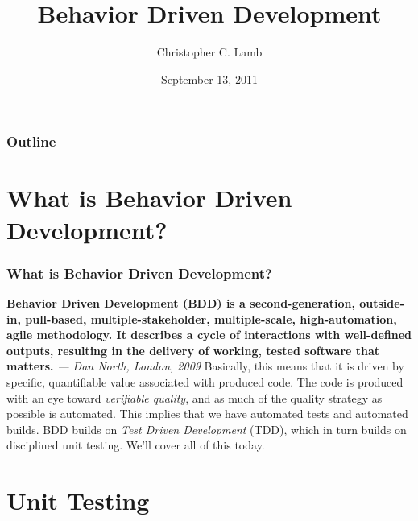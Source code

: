 \documentclass[t, 10pt]{beamer}
\title{Behavior Driven Development}
\author [Chris]{Christopher C. Lamb}
\institute[University of New Mexico]{
\inst {}Department of Electrical and Computer Engineering\\
University of New Mexico}
\date{September 13, 2011}
\begin{document}
\begin{frame}
\titlepage
\end{frame}


\begin{frame}
\frametitle{Outline}
\tableofcontents 
\end{frame}

\section{What is Behavior Driven Development?}

\begin{frame}
\frametitle{What is Behavior Driven Development?}
\textbf{Behavior Driven Development (BDD) is a second-generation, outside-in, pull-based, multiple-stakeholder, multiple-scale, high-automation, agile methodology. It describes a cycle of interactions with well-defined outputs, resulting in the delivery of working, tested software that matters.}
\newline
\textit{--- Dan North, London, 2009}
\newline
\newline
\newline
Basically, this means that it is driven by specific, quantifiable value associated with produced code.  The code is produced with an eye toward \textit{verifiable quality}, and as much of the quality strategy as possible is automated.  This implies that we have automated tests and automated builds.  BDD builds on \textit{Test Driven Development} (TDD), which in turn builds on disciplined unit testing.  We'll cover all of this today.
\end{frame}

\section{Unit Testing}
\end{document}
